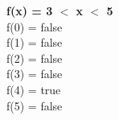 \begin{frame}
    \begin{center}
        \textbf{f(x) = 3 $<$ x $<$ 5} \\
	    \vspace{3.0mm}
        f(0) = false\\
        f(1) = false\\
        f(2) = false\\
        f(3) = false\\
        f(4) = true \\
        f(5) = false\\
    \end{center}
\end{frame}
